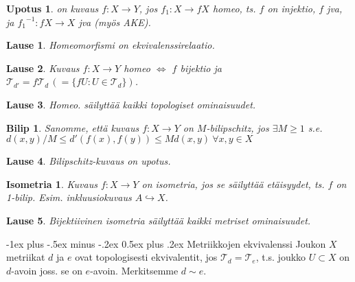 \documentclass[landscape,a4paper,10pt]{article}
\makeatletter
\renewcommand{\section}{\@startsection{section}{1}{0mm}%
                                {-1ex plus -.5ex minus -.2ex}%
                                {0.5ex plus .2ex}%
                                {\color{blue}\normalfont\large\bfseries}}
\theoremstyle{customtheoremstyle}
\newtheorem*{theorem}{Lause}
\makeatother
\begin{document}
\begin{multicols*}{3}
\newtheorem*{defn:upotus}{Upotus}
\begin{defn:upotus}
  on kuvaus $f: X \rightarrow Y$, jos $f_1 : X \rightarrow f X$ homeo, ts. $f$
  on injektio, $f$ jva, ja ${f_1}^{-1}: f X \rightarrow X$ jva (myös AKE).
\end{defn:upotus}

\begin{theorem}
  Homeomorfismi on ekvivalenssirelaatio.
\end{theorem}

\begin{theorem}
  Kuvaus $f: X \rightarrow Y$ homeo $\iff$ $f$ bijektio ja $\mathcal{T}_{d'} =
  f \mathcal{T}_d \,(= \{ f U : U \in \mathcal{T}_d \})$.
\end{theorem}

\begin{theorem}
  Homeo. säilyttää kaikki topologiset ominaisuudet.
\end{theorem}

\newtheorem*{defn:bilip}{Bilip}
\begin{defn:bilip}
  Sanomme, että kuvaus $f: X \rightarrow Y$ on $M$-bilipschitz, jos
  $\exists M \geq 1$ s.e.
  $
  d(x,y) / M \leq d'(f(x), f(y)) \leq M d(x,y) \: \forall x,y \in X
  $
\end{defn:bilip}

\begin{theorem}
  Bilipschitz-kuvaus on upotus.
\end{theorem}

\newtheorem*{defn:isometria}{Isometria}
\begin{defn:isometria}
  Kuvaus $f: X \rightarrow Y$ on isometria, jos se säilyttää etäisyydet, ts.
  $f$ on 1-bilip. Esim. inkluusiokuvaus $A \hookrightarrow X$.
\end{defn:isometria}

\begin{theorem}
  Bijektiivinen isometria säilyttää kaikki metriset ominaisuudet.
\end{theorem}

\section{Metriikkojen ekvivalenssi}
Joukon $X$ metriikat $d$ ja $e$ ovat topologisesti ekvivalentit, jos
$\mathcal{T}_d = \mathcal{T}_e$, t.s. joukko $U \subset X$ on $d$-avoin joss.
se on $e$-avoin. Merkitsemme $d \sim e$.


\end{multicols*}
\end{document}
